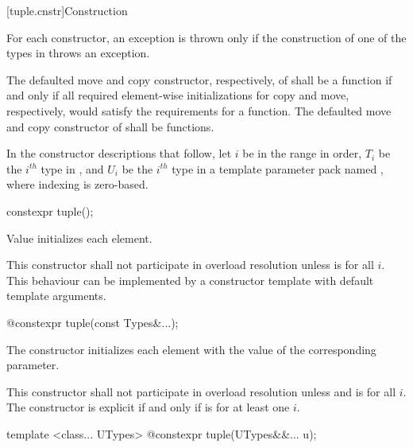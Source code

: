 [tuple.cnstr]{Construction}

\pnum
For each  constructor, an exception is thrown only if the construction of
one of the types in  throws an exception.

\pnum
The defaulted move and copy constructor, respectively, of
 shall be a  function if and only if all
required element-wise initializations for copy and move, respectively,
would satisfy the requirements for a  function. The
defaulted move and copy constructor of  shall be
 functions.

\pnum
In the constructor descriptions that follow, let $i$ be in the range
 in order, $T_i$ be the $i^{th}$ type in , and
$U_i$ be the $i^{th}$ type in a template parameter pack named , where indexing
is zero-based.

%
\begin{itemdecl}
constexpr tuple();
\end{itemdecl}

\begin{itemdescr}
\pnum
\effects  Value initializes each element.

\pnum
\remarks
This constructor shall not participate in overload resolution unless
 is  for all $i$.
\enternote This behaviour can be implemented by a constructor template
with default template arguments. \exitnote
\end{itemdescr}

%
\begin{itemdecl}
@\EXPLICIT@ constexpr tuple(const Types&...);
\end{itemdecl}

\begin{itemdescr}
\pnum
\effects The constructor initializes each element with the value of the
corresponding parameter.
\end{itemdescr}

\pnum
\remarks This constructor shall not participate in overload resolution unless
 and 
is  for all $i$. The constructor is explicit if and only if
 is 
for at least one $i$.

%
\begin{itemdecl}
template <class... UTypes>
  @\EXPLICIT@ constexpr tuple(UTypes&&... u);
\end{itemdecl}

